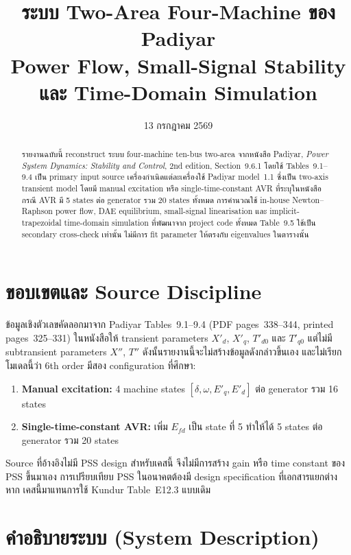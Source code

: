 \documentclass[12pt,a4paper]{article}
\title{\textbf{ระบบ Two-Area Four-Machine ของ Padiyar}\\
\large Power Flow, Small-Signal Stability และ Time-Domain Simulation}
\date{13 กรกฎาคม 2569}
\begin{document}
\maketitle

\begin{abstract}
รายงานฉบับนี้ reconstruct ระบบ four-machine ten-bus two-area จากหนังสือ
Padiyar, \emph{Power System Dynamics: Stability and Control}, 2nd edition,
Section~9.6.1 โดยใช้ Tables~9.1--9.4 เป็น primary input source เครื่องกำเนิดแต่ละเครื่องใช้ Padiyar model~1.1 ซึ่งเป็น two-axis transient model
โดยมี manual excitation หรือ single-time-constant AVR ที่ระบุในหนังสือ
กรณี AVR มี 5 states ต่อ generator รวม 20 states ทั้งหมด การคำนวณใช้ in-house Newton--Raphson power flow, DAE equilibrium, small-signal linearisation และ implicit-trapezoidal time-domain simulation ที่พัฒนาจาก project code ทั้งหมด Table~9.5 ใช้เป็น secondary cross-check เท่านั้น ไม่มีการ fit parameter ให้ตรงกับ eigenvalues ในตารางนั้น
\end{abstract}
\newpage
\tableofcontents
\newpage

\section{ขอบเขตและ Source Discipline}

ข้อมูลเชิงตัวเลขคัดลอกมาจาก Padiyar Tables~9.1--9.4 (PDF pages~338--344, printed pages~325--331) ในหนังสือให้ transient parameters $X'_d$, $X'_q$, $T'_{d0}$ และ $T'_{q0}$ แต่ไม่มี subtransient parameters $X''$, $T''$ ดังนั้นรายงานนี้จะไม่สร้างข้อมูลดังกล่าวขึ้นเอง และไม่เรียกโมเดลนี้ว่า 6th order มีสอง configuration ที่ศึกษา:

\begin{enumerate}
  \item \textbf{Manual excitation:} 4 machine states $[\delta,\omega,E'_q,E'_d]$ ต่อ generator รวม 16 states
  \item \textbf{Single-time-constant AVR:} เพิ่ม $E_{fd}$ เป็น state ที่ 5 ทำให้ได้ 5 states ต่อ generator รวม 20 states
\end{enumerate}

Source ที่อ้างอิงไม่มี PSS design สำหรับเคสนี้ จึงไม่มีการสร้าง gain หรือ time constant ของ PSS ขึ้นมาเอง การเปรียบเทียบ PSS ในอนาคตต้องมี design specification ที่เอกสารแยกต่างหาก เคสนี้มาแทนการใช้ Kundur Table~E12.3 แบบเดิม

\section{คำอธิบายระบบ (System Description)}
\end{document}
